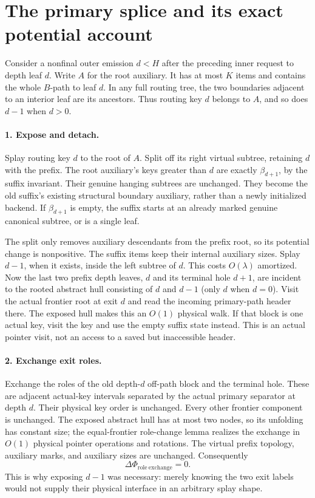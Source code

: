 \documentclass[11pt]{article}
\begin{document}
\section*{The primary splice and its exact potential account}

Consider a nonfinal outer emission $d<H$ after the preceding inner
request to depth leaf $d$. Write $A$ for the root auxiliary. It has
at most $K$ items and contains the whole $B$-path to leaf $d$.
In any full routing tree, the two boundaries adjacent to an interior
leaf are its ancestors. Thus routing key $d$ belongs to $A$, and so
does $d-1$ when $d>0$.

\paragraph{1. Expose and detach.}
Splay routing key $d$ to the root of $A$. Split off its right virtual
subtree, retaining $d$ with the prefix. The root auxiliary's keys
greater than $d$ are exactly $\beta_{d+1}$, by the suffix invariant.
Their genuine hanging subtrees are unchanged. They become the old
suffix's existing structural boundary auxiliary, rather than a newly
initialized backend. If $\beta_{d+1}$ is empty, the suffix starts at
an already marked genuine canonical subtree, or is a single leaf.

The split only removes auxiliary descendants from the prefix root,
so its potential change is nonpositive. The suffix items keep their
internal auxiliary sizes. Splay $d-1$, when it exists, inside the left
subtree of $d$. This costs $O(\lambda)$ amortized. Now the last two
prefix depth leaves, $d$ and its terminal hole $d+1$, are incident
to the rooted abstract hull consisting of $d$ and $d-1$ (only $d$
when $d=0$).
Visit the actual frontier root at exit $d$ and read the incoming
primary-path header there. The exposed hull makes this an $O(1)$
physical walk. If that block is one actual key, visit the key and
use the empty suffix state instead. This is an actual pointer visit,
not an access to a saved but inaccessible header.

\paragraph{2. Exchange exit roles.}
Exchange the roles of the old depth-$d$ off-path block and the terminal
hole. These are adjacent actual-key intervals separated by the actual
primary separator at depth $d$. Their physical key order is unchanged.
Every other frontier component is unchanged. The exposed abstract hull
has at most two nodes, so its unfolding has constant size; the
equal-frontier role-change lemma realizes the exchange in $O(1)$
physical pointer operations and rotations. The virtual prefix topology,
auxiliary marks, and auxiliary sizes are unchanged. Consequently
\[
 \Delta\Phi_{\mathrm{role\ exchange}}=0.            \tag{2}
\]
This is why exposing $d-1$ was necessary: merely knowing the two exit
labels would not supply their physical interface in an arbitrary
splay shape.
\end{document}
